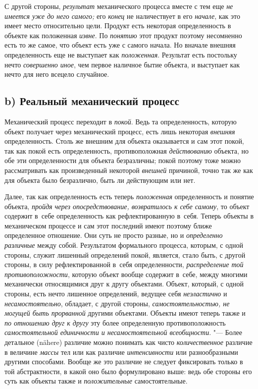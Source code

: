 С другой стороны, {\em результат} механического процесса вместе с тем еще
{\em не имеется уже до него самого;} его {\em конец} не наличествует в его
{\em начале}, как это имеет место относительно цели. Продукт есть некоторая
определенность в объекте как положенная {\em извне}. По {\em понятию}
этот продукт поэтому несомненно есть то же самое, что объект
есть уже с самого начала. Но вначале внешняя определенность еще не
выступает как {\em положенная}. Результат есть постольку нечто
{\em совершенно иное}, чем первое наличное бытие объекта, и выступает
как нечто для него всецело случайное.

\subsection[b) Реальный механический процесс]{b) Реальный механический процесс}

Механический процесс переходит в {\em покой}. Ведь та
определенность, которую объект получает через механический процесс, есть
лишь некоторая {\em внешняя}
определенность. Столь же внешним для объекта оказывается и
сам этот покой, так как покой есть определенность, противоположная
{\em действованию}
объекта, но обе эти определенности для объекта безразличны;
покой поэтому тоже можно рассматривать как произведенный некоторой
{\em внешней} причиной,
точно так же как для объекта было безразлично, быть ли действующим или нет.

Далее, так как определенность есть теперь
{\em положенная}
определенность и понятие объекта,
{\em пройдя через опосредствование,
возвратилось к себе самому}, то объект содержит в~себе
определенность как рефлектированную в~себя. Теперь объекты в
механическом процессе и сам этот последний имеют поэтому ближе определенное
отношение. Они суть не просто разные, но и
{\em определенно различные}
между собой. Результатом формального процесса, которым, с
одной стороны, служит лишенный определений покой, является, стало быть, с
другой стороны, в силу рефлектированной в~себя определенности,
{\em распределение той
противоположности}, которую объект вообще содержит в~себе,
между многими механически относящимися друг к другу объектами. Объект,
который, с одной стороны, есть нечто лишенное определений, ведущее себя
{\em неэластично} и
{\em несамостоятельно},
обладает, с другой стороны,
{\em самостоятельностью, не могущей быть
прорванной} другими объектами. Объекты имеют теперь также и
{\em по отношению друг к другу}
эту более определенную противоположность
{\em самостоятельной единичности и
несамостоятельной всеобщности}. "--- Более детальное (nähere)
различие можно понимать как чисто
{\em количественное}
различие в величине
{\em массы} тел или как
различие {\em интенсивности}
или разнообразными другими способами. Вообще же это различие
не следует фиксировать только в той абстрактности, в какой оно было
формулировано выше: ведь обе стороны его суть как объекты также и
{\em положительные}
самостоятельные.

